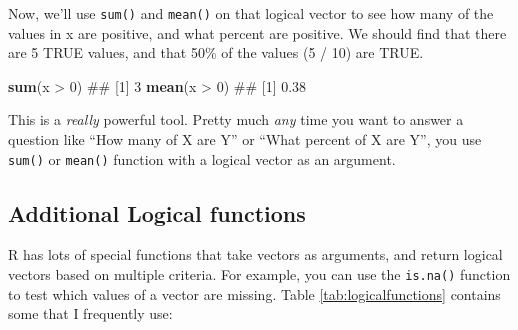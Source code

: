 \documentclass[]{book}
\newenvironment{Shaded}{\begin{snugshade}}{\end{snugshade}}
\newcommand{\KeywordTok}[1]{\textcolor[rgb]{0.13,0.29,0.53}{\textbf{{#1}}}}
\newcommand{\DecValTok}[1]{\textcolor[rgb]{0.00,0.00,0.81}{{#1}}}
\newcommand{\StringTok}[1]{\textcolor[rgb]{0.31,0.60,0.02}{{#1}}}
\newcommand{\NormalTok}[1]{{#1}}
\theoremstyle{definition}
\theoremstyle{definition}
\theoremstyle{remark}
\begin{document}
Now, we'll use \texttt{sum()} and \texttt{mean()} on that logical vector
to see how many of the values in x are positive, and what percent are
positive. We should find that there are 5 TRUE values, and that 50\% of
the values (5 / 10) are TRUE.

\begin{Shaded}
\begin{Highlighting}[]
\KeywordTok{sum}\NormalTok{(x >}\StringTok{ }\DecValTok{0}\NormalTok{)}
\NormalTok{## [1] 3}
\KeywordTok{mean}\NormalTok{(x >}\StringTok{ }\DecValTok{0}\NormalTok{)}
\NormalTok{## [1] 0.38}
\end{Highlighting}
\end{Shaded}

This is a \emph{really} powerful tool. Pretty much \emph{any} time you
want to answer a question like ``How many of X are Y'' or ``What percent
of X are Y'', you use \texttt{sum()} or \texttt{mean()} function with a
logical vector as an argument.

\subsection{Additional Logical
functions}\label{additional-logical-functions}

R has lots of special functions that take vectors as arguments, and
return logical vectors based on multiple criteria. For example, you can
use the \texttt{is.na()} function to test which values of a vector are
missing. Table \ref{tab:logicalfunctions} contains some that I
frequently use:
\end{document}
